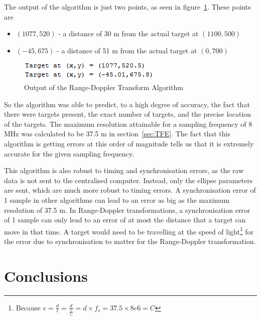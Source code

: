 \documentclass[12pt,openany,a4paper]{book}
\begin{document}
\bigskip

The output of the algorithm is just two points, as seen in figure~\ref{fig:rdout}. These points are

\begin{itemize}
	\item{$(1077,520)$ - a distance of 30 m from the actual target at $(1100,500)$}
	\item{$(-45,675)$ - a distance of 51 m from the actual target at $(0,700)$}
\end{itemize}

\begin{figure}[p]
\centering
\includegraphics{rdout.png}
\caption{Output of the Range-Doppler Transform Algorithm}
\label{fig:rdout}
\end{figure}

\bigskip

So the algorithm was able to predict, to a high degree of accuracy, the fact that there were targets present, the exact number of targets, and the precise location of the targets. The maximum resolution attainable for a sampling frequency of 8 MHz was calculated to be 37.5 m in section~\ref{sec:TFE}. The fact that this algorithm is getting errors at this order of magnitude tells us that it is extremely accurate for the given sampling frequency.

\bigskip

This algorithm is also robust to timing and synchronisation errors, as the raw data is not sent to the centralised computer. Instead, only the ellipse parameters are sent, which are much more robust to timing errors. A synchronisation error of 1 sample in other algorithms can lead to an error as big as the maximum resolution of 37.5 m. In Range-Doppler transformations, a synchronisation error of 1 sample can only lead to an error of at most the distance that a target can move in that time. A target would need to be travelling at the speed of light\footnote{Because \mbox{$v = \frac{d}{t} = \frac{d}{\frac{1}{f_s}} = d\times f_s = 37.5\times 8e6 = C$}} for the error due to synchronisation to matter for the Range-Doppler transformation.

\newpage
\section{Conclusions}
\end{document}
